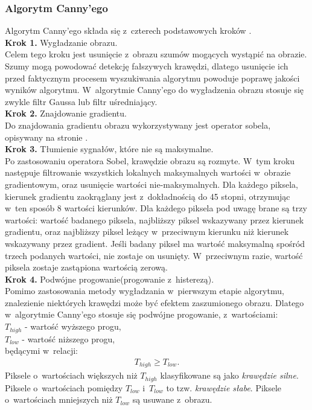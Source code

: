 \subsubsection{Algorytm Canny'ego}
Algorytm Canny'ego składa się z~czterech podstawowych kroków \cite{canny86}.\\
\textbf{Krok 1.} Wygładzanie obrazu. \\
  Celem tego kroku jest usunięcie z~obrazu szumów mogących wystąpić na obrazie. Szumy mogą powodować detekcję fałszywych krawędzi, dlatego usunięcie ich przed faktycznym procesem wyszukiwania algorytmu powoduje poprawę jakości wyników algorytmu. W~algorytmie Canny'ego do wygładzenia obrazu stosuje się zwykle filtr Gaussa lub filtr uśredniający. \\
\textbf{Krok 2.} Znajdowanie gradientu. \\
Do znajdowania gradientu obrazu wykorzystywany jest operator sobela, opisywany na stronie \pageref{sssec:sobel}.\\
\textbf{Krok 3.} Tłumienie sygnałów, które nie są maksymalne. \\
Po zastosowaniu operatora Sobel, krawędzie obrazu są rozmyte. W~tym kroku następuje filtrowanie wszystkich lokalnych maksymalnych wartości w~obrazie gradientowym, oraz usunięcie wartości nie-maksymalnych. Dla każdego piksela, kierunek gradientu zaokrąglany jest z~dokładnością do 45 stopni, otrzymując w~ten sposób 8 wartości kierunków. Dla każdego piksela pod uwagę brane są trzy wartości: wartość badanego piksela, najbliższy piksel wskazywany przez kierunek gradientu, oraz najbliższy piksel leżący w~przeciwnym kierunku niż kierunek wskazywany przez gradient. Jeśli badany piksel ma wartość maksymalną spośród trzech podanych wartości, nie zostaje on usunięty. W~przeciwnym razie, wartość piksela zostaje zastąpiona wartością zerową.\\
\textbf{Krok 4.} Podwójne progowanie(progowanie z~histerezą).\\
  Pomimo zastosowania metody wygładzania w~pierwszym etapie algorytmu, znalezienie niektórych krawędzi może być efektem zaszumionego obrazu. Dlatego w~algorytmie Canny'ego stosuje się podwójne progowanie, z~wartościami:\\
$T_{high}$ - wartość wyższego progu,\\
$T_{low}$ - wartość niższego progu,\\
będącymi w~relacji:
\begin{gather*}
  T_{high} \geq T_{low}.
\end{gather*}
Piksele o~wartościach większych niż $T_{high}$ klasyfikowane są jako \textit{krawędzie silne}. Piksele o~wartościach pomiędzy $T_{low}$ i~$T_{low}$ to tzw. \textit{krawędzie słabe}. Piksele o~wartościach mniejszych niż $T_{low}$ są usuwane z~obrazu.

